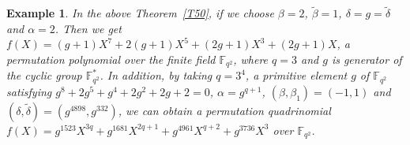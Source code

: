 \documentclass[12pt]{amsart}
\newtheorem{exmp}[thm]{Example}
\newtheorem{rmk}[thm]{Remark}
\numberwithin{equation}{section}
\theoremstyle{definition}
\newcommand{\F}{\mathbb F}
\begin{document}

 \begin{exmp}
 In the above Theorem~\ref{T50}, if we choose $\beta=2$, $\tilde{\beta}=1$, $\delta=g=\tilde{\delta}$ and $\alpha=2$. Then we get $f(X)=(g+1)X^7+2(g+1)X^{5}+(2g+1)X^3+(2g+1)X$, a permutation polynomial over the finite field $\F_{q^2}$, where $q=3$ and $g$ is generator of the cyclic group $\F_{q^2}^{*}$. In addition, by taking $q=3^4$, a primitive element $g$ of $\F_{q^2}$ satisfying $g^8 + 2g^5 + g^4 + 2g^2 + 2g + 2=0$, $\alpha=g^{q+1}$, $(\beta, \beta_1) = (-1, 1)$ and $(\delta, \tilde{\delta}) = (g^{4898}, g^{332})$,
 we can obtain a permutation quadrinomial $f(X) = g^{1523}X^{3q} + g^{1681}X^{2q+1} + g^{4961}X^{q+2} + g^{3736}X^3$ over $\F_{q^2}$.
\end{exmp}

\end{document}

